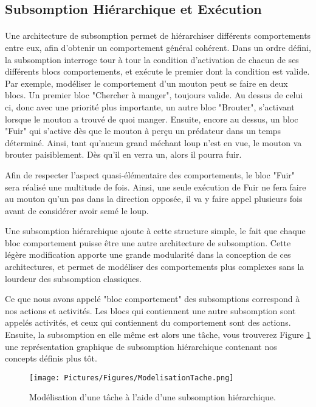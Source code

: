 		\subsection{Subsomption Hiérarchique et Exécution}
		\paragraph{}
			Une architecture de subsomption permet de hiérarchiser différents comportements entre eux, afin d'obtenir un comportement général cohérent\cite{brooks_robust_1986}. Dans un ordre défini, la subsomption interroge tour à tour la condition d'activation de chacun de ses différents blocs comportements, et exécute le premier dont la condition est valide. Par exemple, modéliser le comportement d'un mouton peut se faire en deux blocs. Un premier bloc "Chercher à manger", toujours valide. Au dessus de celui ci, donc avec une priorité plus importante, un autre bloc "Brouter", s'activant lorsque le mouton a trouvé de quoi manger. Ensuite, encore au dessus, un bloc "Fuir" qui s'active dès que le mouton à perçu un prédateur dans un temps déterminé. Ainsi, tant qu'aucun grand méchant loup n'est en vue, le mouton va brouter paisiblement. Dès qu'il en verra un, alors il pourra fuir.
			
			Afin de respecter l'aspect quasi-élémentaire des comportements, le bloc "Fuir" sera réalisé une multitude de fois. Ainsi, une seule exécution de Fuir ne fera faire au mouton qu'un pas dans la direction opposée, il va y faire appel plusieurs fois avant de considérer avoir semé le loup.
			
			Une subsomption hiérarchique ajoute à cette structure simple, le fait que chaque bloc comportement puisse être une autre architecture de subsomption\cite{heckel_representational_2010}. Cette légère modification apporte une grande modularité dans la conception de ces architectures, et permet de modéliser des comportements plus complexes sans la lourdeur des subsomption classiques.
			
			Ce que nous avons appelé "bloc comportement" des subsomptions correspond à nos actions et activités. Les blocs qui contiennent une autre subsomption sont appelés activités, et ceux qui contiennent du comportement sont des actions. Ensuite, la subsomption en elle même est alors une tâche, vous trouverez Figure \ref{ModelisationTache} une représentation graphique de subsomption hiérarchique contenant nos concepts définis plus tôt.
			
			\begin{figure}
			\centering
			\texttt{[image: Pictures/Figures/ModelisationTache.png]}
			\caption{Modélisation d'une tâche à l'aide d'une subsomption hiérarchique.}
			\label{ModelisationTache}
			\end{figure}
